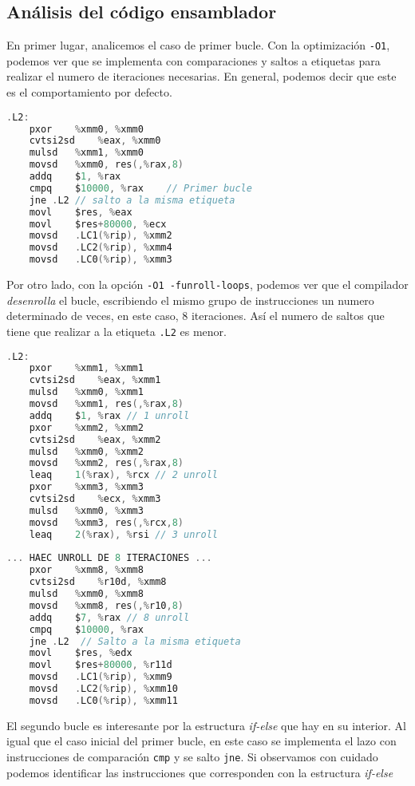\documentclass[10pt,a4paper]{article}
\begin{document}
\subsection{Análisis del código ensamblador}

En primer lugar, analicemos el caso de primer bucle. Con la optimización \texttt{-O1}, podemos ver que se implementa con comparaciones y saltos a etiquetas para realizar el numero de iteraciones necesarias. En general, podemos decir que este es el comportamiento por defecto. 

\begin{lstlisting}[language=C]
.L2:
	pxor	%xmm0, %xmm0
	cvtsi2sd	%eax, %xmm0
	mulsd	%xmm1, %xmm0
	movsd	%xmm0, res(,%rax,8)
	addq	$1, %rax
	cmpq	$10000, %rax	// Primer bucle
	jne	.L2 // salto a la misma etiqueta
	movl	$res, %eax	
	movl	$res+80000, %ecx
	movsd	.LC1(%rip), %xmm2
	movsd	.LC2(%rip), %xmm4
	movsd	.LC0(%rip), %xmm3
\end{lstlisting}

Por otro lado, con la opción \texttt{-O1 -funroll-loops}, podemos ver que el compilador \textit{desenrolla} el bucle, escribiendo el mismo grupo de instrucciones un numero determinado de veces, en este caso, 8 iteraciones. Así el numero de saltos que tiene que realizar a la etiqueta \texttt{.L2} es menor.
\begin{lstlisting}[language=C]
.L2:
	pxor	%xmm1, %xmm1
	cvtsi2sd	%eax, %xmm1
	mulsd	%xmm0, %xmm1
	movsd	%xmm1, res(,%rax,8)
	addq	$1, %rax // 1 unroll
	pxor	%xmm2, %xmm2
	cvtsi2sd	%eax, %xmm2
	mulsd	%xmm0, %xmm2
	movsd	%xmm2, res(,%rax,8)
	leaq	1(%rax), %rcx // 2 unroll
	pxor	%xmm3, %xmm3
	cvtsi2sd	%ecx, %xmm3
	mulsd	%xmm0, %xmm3
	movsd	%xmm3, res(,%rcx,8)
	leaq	2(%rax), %rsi // 3 unroll
	
... HAEC UNROLL DE 8 ITERACIONES ...
	pxor	%xmm8, %xmm8 
	cvtsi2sd	%r10d, %xmm8
	mulsd	%xmm0, %xmm8
	movsd	%xmm8, res(,%r10,8)
	addq	$7, %rax // 8 unroll
	cmpq	$10000, %rax
	jne	.L2  // Salto a la misma etiqueta
	movl	$res, %edx
	movl	$res+80000, %r11d
	movsd	.LC1(%rip), %xmm9
	movsd	.LC2(%rip), %xmm10
	movsd	.LC0(%rip), %xmm11
\end{lstlisting}

El segundo bucle es interesante por la estructura \textit{if-else} que hay en su interior. Al igual que el caso inicial del primer bucle, en este caso se implementa el lazo con instrucciones de comparación \texttt{cmp} y se salto \texttt{jne}. Si observamos con cuidado podemos identificar las instrucciones que corresponden con la estructura \textit{if-else}
\end{document}
